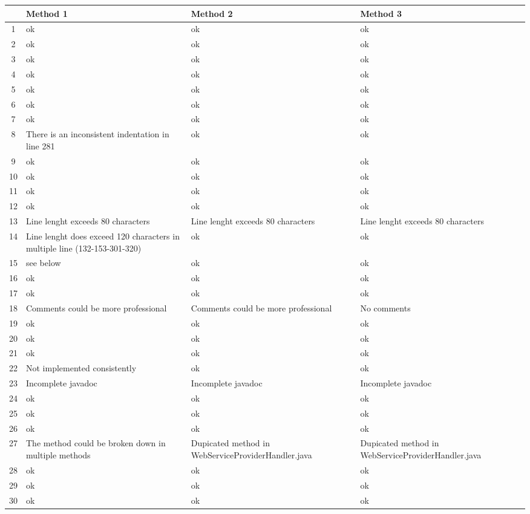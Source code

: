 \newpage
\begin{tabular}{|c|p{4cm}|p{4cm}|p{4cm}|}
\hline
 & Method 1 & Method 2 & Method 3\\
\hline
1 & ok & ok & ok\\
\hline
2 & ok & ok & ok\\
\hline
3 & ok & ok & ok\\
\hline
4 & ok & ok & ok\\
\hline
5 & ok & ok & ok\\
\hline
6 & ok & ok & ok\\
\hline
7 & ok & ok & ok\\
\hline
8 & There is an inconsistent indentation in line 281 & ok & ok \\
\hline
9 & ok & ok  & ok \\
\hline
10 & ok & ok & ok \\
\hline
11 & ok & ok & ok \\
\hline
12 & ok & ok & ok \\
\hline
13 & Line lenght exceeds 80 characters & Line lenght exceeds 80 characters & Line lenght exceeds 80 characters \\
\hline
14 & Line lenght does exceed 120 characters in multiple line (132-153-301-320) & ok & ok \\
\hline
15 & see below & ok & ok \\
\hline
16 & ok & ok & ok \\
\hline
17 & ok & ok & ok \\
\hline
18 & Comments could be more professional & Comments could be more professional & No comments \\
\hline
19 & ok & ok & ok \\
\hline
20 & ok & ok & ok \\
\hline
21 & ok & ok & ok \\
\hline
22 & Not implemented consistently & ok & ok \\
\hline
23 & Incomplete javadoc & Incomplete javadoc & Incomplete javadoc \\
\hline
24 & ok & ok & ok \\
\hline
25 & ok & ok & ok \\
\hline
26 & ok & ok & ok \\
\hline
27 & The method could be broken down in multiple methods & Dupicated method in WebServiceProviderHandler.java & Dupicated method in WebServiceProviderHandler.java \\
\hline
28 & ok & ok & ok \\
\hline
29 & ok & ok & ok \\
\hline
30 & ok & ok & ok \\
\hline
\end{tabular}
\newpage

